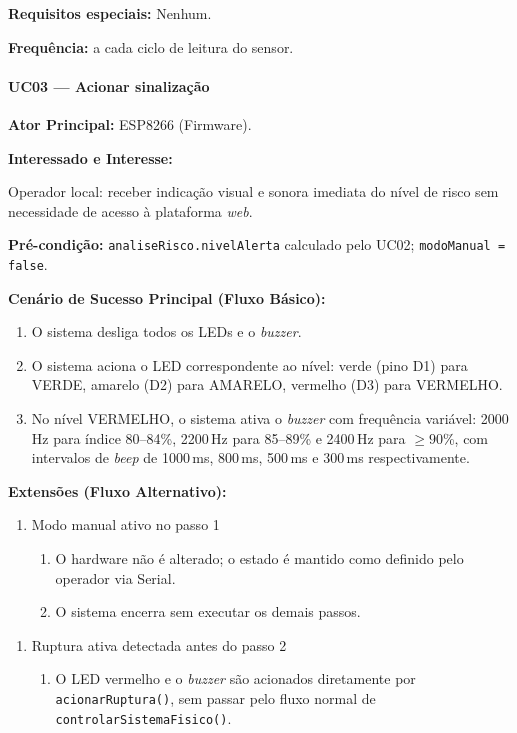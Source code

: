 \textbf{Requisitos especiais:} Nenhum.

\textbf{Frequência:} a cada ciclo de leitura do sensor.

\paragraph{UC03 --- Acionar sinalização}\hfill\break

\textbf{Ator Principal:} ESP8266 (Firmware).

\textbf{Interessado e Interesse:}

Operador local: receber indicação visual e sonora imediata do
nível de risco sem necessidade de acesso à plataforma \textit{web}.

\textbf{Pré-condição:} \texttt{analiseRisco.nivelAlerta} calculado
pelo UC02; \texttt{modoManual = false}.

\textbf{Cenário de Sucesso Principal (Fluxo Básico):}
\begin{enumerate}
  \item O sistema desliga todos os LEDs e o \textit{buzzer}.
  \item O sistema aciona o LED correspondente ao nível: verde
        (pino D1) para VERDE, amarelo (D2) para AMARELO,
        vermelho (D3) para VERMELHO.
  \item No nível VERMELHO, o sistema ativa o \textit{buzzer}
        com frequência variável: 2000\,Hz para índice 80--84\%,
        2200\,Hz para 85--89\% e 2400\,Hz para $\geq 90$\%,
        com intervalos de \textit{beep} de 1000\,ms, 800\,ms,
        500\,ms e 300\,ms respectivamente.
\end{enumerate}

\textbf{Extensões (Fluxo Alternativo):}

\begin{enumerate}
  \renewcommand{\theenumi}{1a}
  \renewcommand{\labelenumi}{\theenumi.}
  \item Modo manual ativo no passo 1
  \begin{enumerate}
  \item O hardware não é alterado; o estado é mantido como
        definido pelo operador via Serial.
  \item O sistema encerra sem executar os demais passos.
  \end{enumerate}
\end{enumerate}

\begin{enumerate}
  \renewcommand{\theenumi}{2a}
  \renewcommand{\labelenumi}{\theenumi.}
  \item Ruptura ativa detectada antes do passo 2
  \begin{enumerate}
  \item O LED vermelho e o \textit{buzzer} são acionados
        diretamente por \texttt{acionarRuptura()}, sem passar
        pelo fluxo normal de \texttt{controlarSistemaFisico()}.
  \end{enumerate}
\end{enumerate}

